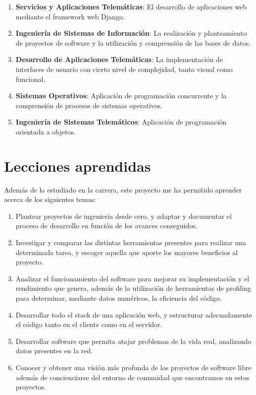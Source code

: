 \documentclass[a4paper, spanish, 12pt]{book}
\begin{document}
\begin{enumerate}
  \item \textbf{Servicios y Aplicaciones Telem\'aticas}: El desarrollo de aplicaciones
  web mediante el framework web Django.

  \item \textbf{Ingenier\'ia de Sistemas de Informaci\'on}: La realizaci\'on y planteamiento
  de proyectos de software y la utilizaci\'on y comprensi\'on de las bases de datos.

  \item \textbf{Desarrollo de Aplicaciones Telem\'aticas}: La implementaci\'on de
  interfaces de usuario con cierto nivel de complejidad, tanto visual como funcional.

  \item \textbf{Sistemas Operativos}: Aplicaci\'on de programaci\'on concurrente
  y la comprensi\'on de procesos de sistemas operativos.

  \item \textbf{Ingenier\'ia de Sistemas Telem\'aticos}: Aplicaci\'on de programaci\'on
  orientada a objetos.
\end{enumerate}

\section{Lecciones aprendidas}
\label{sec:lecciones_aprendidas}

Adem\'as de lo estudiado en la carrera, este proyecto me ha permitido aprender
acerca de los siguientes temas:

\begin{enumerate}
  \item Plantear proyectos de ingenier\'ia desde cero, y adaptar y documentar el proceso de
  desarrollo en funci\'on de los avances conseguidos.

  \item Investigar y comparar las distintas herramientas presentes para realizar
  una determinada tarea, y escoger aquella que aporte los mayores beneficios al proyecto.

  \item Analizar el funcionamiento del software para mejorar su implementaci\'on y
  el rendimiento que genera, adem\'as de la utilizaci\'on de herramientas de profiling
  para determinar, mediante datos num\'ericos, la eficiencia del c\'odigo.

  \item Desarrollar todo el stack de una aplicaci\'on web, y estructurar adecuadamente
  el c\'odigo tanto en el cliente como en el servidor.

  \item Desarrollar software que permita atajar problemas de la vida real, analizando
  datos presentes en la red.

  \item Conocer y obtener una visi\'on m\'as profunda de los proyectos de software libre
  adem\'as de concienciarse del entorno de comunidad que encontramos en estos proyectos.
\end{enumerate}
\end{document}
